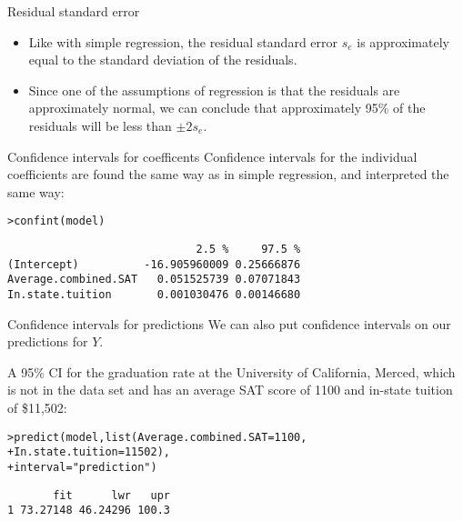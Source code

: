 \documentclass{beamer}\usepackage[]{graphicx}\usepackage[]{color}
\makeatletter
\newcommand{\hlnum}[1]{\textcolor[rgb]{0.824,0.412,0.118}{#1}}%
\newcommand{\hlstr}[1]{\textcolor[rgb]{1,0.894,0.71}{#1}}%
\newcommand{\hlstd}[1]{\textcolor[rgb]{1,0.894,0.769}{#1}}%
\newcommand{\hlkwc}[1]{\textcolor[rgb]{0.78,0.941,0.545}{#1}}%
\newcommand{\hlkwd}[1]{\textcolor[rgb]{1,0.78,0.769}{#1}}%
\newenvironment{kframe}{%
 \def\at@end@of@kframe{}%
 \ifinner\ifhmode%
  \def\at@end@of@kframe{\end{minipage}}%
  \begin{minipage}{\columnwidth}%
 \fi\fi%
 \def\FrameCommand##1{\hskip\@totalleftmargin \hskip-\fboxsep
 \colorbox{shadecolor}{##1}\hskip-\fboxsep
     \hskip-\linewidth \hskip-\@totalleftmargin \hskip\columnwidth}%
 \MakeFramed {\advance\hsize-\width
   \@totalleftmargin\z@ \linewidth\hsize
   \@setminipage}}%
 {\par\unskip\endMakeFramed%
 \at@end@of@kframe}
\newenvironment{knitrout}{}{} %
\makeatother
\begin{document}
\begin{darkframes}
    \begin{frame}{Residual standard error}
      \begin{itemize}[<+->]
        \item Like with simple regression, the \alert{residual standard error} $s_e$ is approximately equal to the standard deviation of the residuals.
        \item Since one of the assumptions of regression is that the residuals are approximately normal, we can conclude that approximately 95\% of the residuals will be less than $\pm 2s_e$.
      \end{itemize}
    \end{frame}

    \begin{frame}[fragile]{Confidence intervals for coefficents}
      Confidence intervals for the individual coefficients are found the same way as in simple regression, and interpreted the same way:
\begin{knitrout}
\begin{kframe}
\begin{alltt}
\hlstd{> }\hlkwd{confint}\hlstd{(model)}
\end{alltt}
\begin{verbatim}
                             2.5 %     97.5 %
(Intercept)          -16.905960009 0.25666876
Average.combined.SAT   0.051525739 0.07071843
In.state.tuition       0.001030476 0.00146680
\end{verbatim}
\end{kframe}
\end{knitrout}
    \end{frame}

    \begin{frame}[fragile]{Confidence intervals for predictions}
      \fontsm
      We can also put confidence intervals on our predictions for $Y$.

      \bigskip\pause

      A 95\% CI for the graduation rate at the University of California, Merced, which is not in the data set and has an average SAT score of 1100 and in-state tuition of \$11,502:
\begin{knitrout}
\begin{kframe}
\begin{alltt}
\hlstd{> }\hlkwd{predict}\hlstd{(model,} \hlkwd{list}\hlstd{(}\hlkwc{Average.combined.SAT}\hlstd{=}\hlnum{1100}\hlstd{,}
\hlstd{+ }                    \hlkwc{In.state.tuition}\hlstd{=}\hlnum{11502}\hlstd{),}
\hlstd{+ }               \hlkwc{interval}\hlstd{=}\hlstr{"prediction"}\hlstd{)}
\end{alltt}
\begin{verbatim}
       fit      lwr   upr
1 73.27148 46.24296 100.3
\end{verbatim}
\end{kframe}
\end{knitrout}
      


\end{frame}
\end{darkframes}
\end{document}
